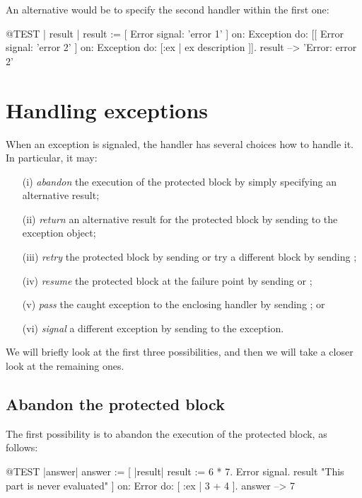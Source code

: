 \documentclass[a4paper,10pt,twoside]{book}
\begin{document}
An alternative would be to specify the second handler within the first one:
\begin{code}{@TEST | result |}
result := [ Error signal: 'error 1' ]
	on: Exception
	do: [[ Error signal: 'error 2' ]
		on: Exception
		do: [:ex | ex description ]].
result --> 'Error: error 2'
\end{code}

\section{Handling exceptions}

When an exception is signaled, the handler has several choices how to handle it.
In particular, it may:
\begin{itemize}
\item[(i)] \emph{abandon} the execution of the protected block by simply specifying an alternative result;
\item[(ii)] \emph{return} an alternative result for the protected block by sending  to the exception object;
\item[(iii)] \emph{retry} the protected block by sending  or try a different block by sending ;
\item[(iv)] \emph{resume} the protected block at the failure point by sending  or ;
\item[(v)] \emph{pass} the caught exception to the enclosing handler by sending ; or
\item[(vi)] \emph{signal} a different exception by sending  to the exception. 
\end{itemize}

We will briefly look at the first three possibilities, and then we will take a closer look at the remaining ones.

\subsection{Abandon the protected block}

The first possibility is to abandon the execution of the protected block, as follows:
\begin{code}{@TEST |answer|}
answer := [ |result|
	result := 6 * 7.
	Error signal.
	result 	"This part is never evaluated"
]	on: Error
	do: [ :ex | 3 + 4 ].
answer --> 7
\end{code}
\end{document}
